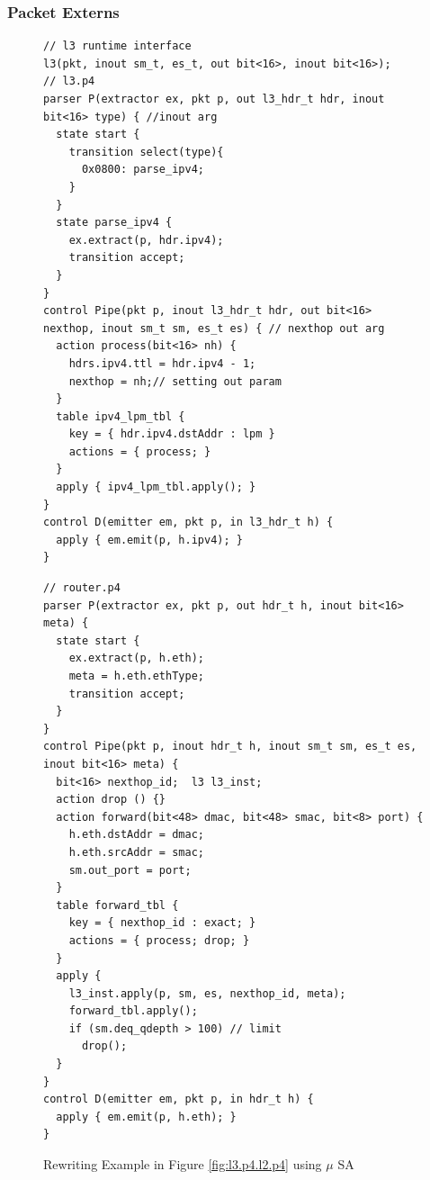 \subsubsection{Packet Externs}

\begin{figure}[H]
\noindent \begin{minipage}[t]{.50\textwidth}
\begin{lstlisting}[frame=none]
// l3 runtime interface
l3(pkt, inout sm_t, es_t, out bit<16>, inout bit<16>);
// l3.p4
parser P(extractor ex, pkt p, out l3_hdr_t hdr, inout bit<16> type) { //inout arg
  state start {
    transition select(type){
      0x0800: parse_ipv4;
    }
  }
  state parse_ipv4 {
    ex.extract(p, hdr.ipv4);
    transition accept;
  }
}
control Pipe(pkt p, inout l3_hdr_t hdr, out bit<16> nexthop, inout sm_t sm, es_t es) { // nexthop out arg
  action process(bit<16> nh) {
    hdrs.ipv4.ttl = hdr.ipv4 - 1;
    nexthop = nh;// setting out param
  }
  table ipv4_lpm_tbl {
    key = { hdr.ipv4.dstAddr : lpm } 
    actions = { process; }
  }
  apply { ipv4_lpm_tbl.apply(); }
}
control D(emitter em, pkt p, in l3_hdr_t h) {
  apply { em.emit(p, h.ipv4); }
}
\end{lstlisting}
\end{minipage}\hspace{-4pt}\vline
\hfill\begin{minipage}[t]{.50\textwidth}
\begin{lstlisting}[frame=none]
// router.p4
parser P(extractor ex, pkt p, out hdr_t h, inout bit<16> meta) {
  state start {
    ex.extract(p, h.eth);
    meta = h.eth.ethType;    
    transition accept;
  }
}
control Pipe(pkt p, inout hdr_t h, inout sm_t sm, es_t es, inout bit<16> meta) {
  bit<16> nexthop_id;  l3 l3_inst;
  action drop () {}           
  action forward(bit<48> dmac, bit<48> smac, bit<8> port) {
    h.eth.dstAddr = dmac;
    h.eth.srcAddr = smac;
    sm.out_port = port;    
  }
  table forward_tbl {
    key = { nexthop_id : exact; } 
    actions = { process; drop; }
  }
  apply {
    l3_inst.apply(p, sm, es, nexthop_id, meta);
    forward_tbl.apply(); 
    if (sm.deq_qdepth > 100) // limit
      drop();
  }
}
control D(emitter em, pkt p, in hdr_t h) {
  apply { em.emit(p, h.eth); }
}
\end{lstlisting}
\end{minipage}
\caption{Rewriting Example in Figure \ref{fig:l3.p4.l2.p4} using $\mu$ SA}
\label{fig:modular-routing}
\end{figure}

